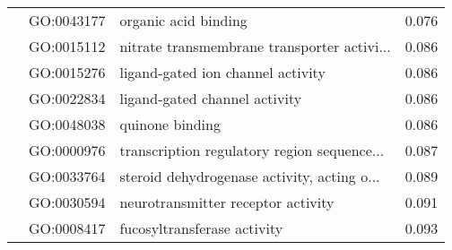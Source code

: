 \begin{longtable}{lllr}
   & GO:0043177 &                         organic acid binding &         0.076 \\
   & GO:0015112 &  nitrate transmembrane transporter activi... &         0.086 \\
   & GO:0015276 &            ligand-gated ion channel activity &         0.086 \\
   & GO:0022834 &                ligand-gated channel activity &         0.086 \\
   & GO:0048038 &                              quinone binding &         0.086 \\
   & GO:0000976 &  transcription regulatory region sequence... &         0.087 \\
   & GO:0033764 &  steroid dehydrogenase activity, acting o... &         0.089 \\
   & GO:0030594 &           neurotransmitter receptor activity &         0.091 \\
   & GO:0008417 &                  fucosyltransferase activity &         0.093 \\
\end{longtable}

